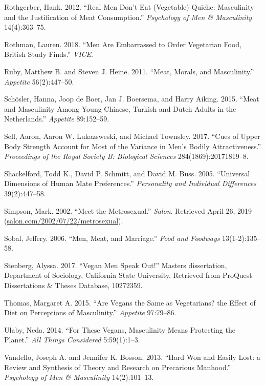 \documentclass[twoside]{report}
\begin{document}
\hypertarget{rothgerber}{Rothgerber, Hank. 2012. ``Real Men Don't Eat (Vegetable) Quiche: Masculinity and the Justification of Meat Consumption.'' \emph{Psychology of Men \& Masculinity} 14(4):363--75.}

\hypertarget{rothman}{Rothman, Lauren. 2018. ``Men Are Embarrassed to Order Vegetarian Food, British Study Finds.'' \emph{VICE}.}

\hypertarget{ruby}{Ruby, Matthew B. and Steven J. Heine. 2011. ``Meat, Morals, and Masculinity.'' \emph{Appetite} 56(2):447--50.}

\hypertarget{schosler}{Schösler, Hanna, Joop de Boer, Jan J. Boersema, and Harry Aiking. 2015. ``Meat and Masculinity Among Young Chinese, Turkish and Dutch Adults in the Netherlands.'' \emph{Appetite} 89:152--59.}

\hypertarget{sell}{Sell, Aaron, Aaron W. Lukazsweski, and Michael Townsley. 2017. ``Cues of Upper Body Strength Account for Most of the Variance in Men's Bodily Attractiveness.'' \emph{Proceedings of the Royal Society B: Biological Sciences} 284(1869):20171819--8.}

\hypertarget{shackelford}{Shackelford, Todd K., David P. Schmitt, and David M. Buss. 2005. ``Universal Dimensions of Human Mate Preferences.'' \emph{Personality and Individual Differences} 39(2):447--58.}

\hypertarget{simpson}{Simpson, Mark. 2002. ``Meet the Metrosexual.'' \emph{Salon}. Retrieved April 26, 2019 (\href{http://salon.com/2002/07/22/metrosexual}{salon.com/2002/07/22/metrosexual}).}

\hypertarget{sobal}{Sobal, Jeffery. 2006. ``Men, Meat, and Marriage.'' \emph{Food and Foodways} 13(1-2):135--58.}

\hypertarget{stenberg}{Stenberg, Alyssa. 2017. ``Vegan Men Speak Out!'' Masters dissertation, Department of Sociology, California State University. Retrieved from ProQuest Dissertations \& Theses Database, 10272359.}

\pagebreak

\hypertarget{thomas}{Thomas, Margaret A. 2015. ``Are Vegans the Same as Vegetarians? the Effect of Diet on Perceptions of Masculinity.'' \emph{Appetite} 97:79--86.}

\hypertarget{ulaby}{Ulaby, Neda. 2014. ``For These Vegans, Masculinity Means Protecting the Planet.'' \emph{All Things Considered} 5:59(1):1--3.}

\hypertarget{vandello}{Vandello, Joseph A. and Jennifer K. Bosson. 2013. ``Hard Won and Easily Lost: a Review and Synthesis of Theory and Research on Precarious Manhood.'' \emph{Psychology of Men \& Masculinity} 14(2):101--13.}
\end{document}
